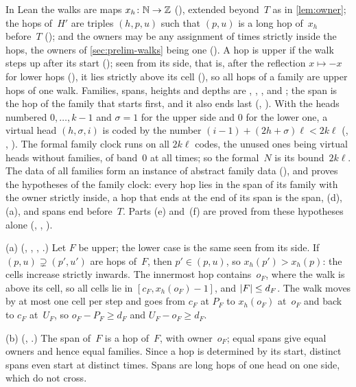 \begin{outline}
In Lean the walks are maps $x_h\colon\mathbb{N}\to\mathbb{Z}$ (), extended beyond~$T$ as in \cref{lem:owner}; the hops of~$H'$ are
triples $(h,p,u)$ such that $(p,u)$ is a long hop of~$x_h$ before~$T$ (); and the owners may be any assignment of
times strictly inside the hops, the owners of \cref{sec:prelim-walks} being one (). A hop is upper if the
walk steps up after its start (); seen from its side, that is, after the reflection $x\mapsto-x$ for lower hops
(), it lies strictly above its cell (), so all hops of a family are upper hops of one walk. Families,
spans, heights and depths are , , ,  and ; the span is the hop of
the family that starts first, and it also ends last (, ). With the heads numbered
$0,\dots,k-1$ and $\sigma=1$ for the upper side and $0$ for the lower one, a virtual head $(h,\sigma,i)$ is coded by the number
$(i-1)+(2h+\sigma)\ell<2k\ell$ (, , ). The formal family clock runs
on all $2k\ell$ codes, the unused ones being virtual heads without families, of band~$0$ at all times; so the formal~$N$ is
its bound~$2k\ell$. The data of all families form an instance  of abstract family data (), and
 proves the hypotheses  of the family clock: every hop lies in the span of its family with
the owner strictly inside, a hop that ends at the end of its span is the span, (d), (a), and spans end before~$T$. Parts (e)
and~(f) are proved from these hypotheses alone (, ,
).

(a) (, , , .) Let $F$ be upper; the lower case is the same seen from its side. If $(p,u)\supsetneq(p',u')$ are hops of~$F$, then $p'\in(p,u)$, so
$x_h(p')>x_h(p)$: the cells increase strictly inwards. The innermost hop contains~$o_F$, where the walk is above its cell,
so all cells lie in $[c_F,x_h(o_F)-1]$, and $\lvert F \rvert\le d_F$. The walk moves by at most one cell per step and goes from
$c_F$ at $P_F$ to $x_h(o_F)$ at~$o_F$ and back to $c_F$ at~$U_F$, so $o_F-P_F\ge d_F$ and $U_F-o_F\ge d_F$.

(b) (, .) The span of~$F$ is a hop of~$F$, with owner~$o_F$; equal spans give equal owners
and hence equal families. Since a hop is determined by its start, distinct spans even start at distinct times. Spans are
long hops of one head on one side, which do not cross.


\end{outline}
